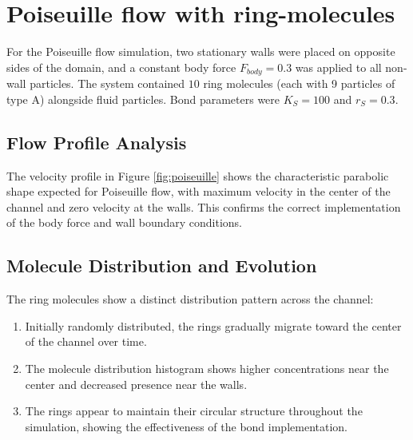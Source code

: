 \section{Poiseuille flow with ring-molecules}
For the Poiseuille flow simulation, two stationary walls were placed on opposite sides of the domain, and a constant body force $F_{body} = 0.3$ was applied to all non-wall particles. The system contained $10$ ring molecules (each with 9 particles of type A) alongside fluid particles. Bond parameters were $K_S = 100$ and $r_S = 0.3$.

\subsection{Flow Profile Analysis}
The velocity profile in Figure \ref{fig:poiseuille} shows the characteristic parabolic shape expected for Poiseuille flow, with maximum velocity in the center of the channel and zero velocity at the walls. This confirms the correct implementation of the body force and wall boundary conditions.

\subsection{Molecule Distribution and Evolution}
The ring molecules show a distinct distribution pattern across the channel:
\begin{enumerate}
	\item Initially randomly distributed, the rings gradually migrate toward the center of the channel over time.
	\item The molecule distribution histogram shows higher concentrations near the center and decreased presence near the walls.
	\item The rings appear to maintain their circular structure throughout the simulation, showing the effectiveness of the bond implementation.
\end{enumerate}

